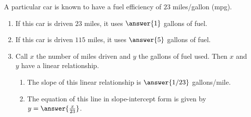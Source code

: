 \documentclass{ximera}
\author{Bobby Ramsey}
\begin{document}
\begin{exercise}
A particular car is known to have a fuel efficiency of $23$ miles/gallon (mpg).


\begin{enumerate}
	\item If this car is driven $23$ miles, it uses $\answer{1}$ gallons of fuel.

	\item If this car is driven $115$ miles, it uses $\answer{5}$ gallons of fuel.

	\item Call $x$ the number of miles driven and $y$ the gallons of fuel used. Then $x$ and $y$ have a linear relationship.
	
		\begin{enumerate}

			\item The slope of this linear relationship is $\answer{1/23}$ gallons/mile.

			\item The equation of this line in slope-intercept form is given by $y = \answer{\frac{x}{23}}$.

		\end{enumerate}
\end{enumerate}


\end{exercise}
\end{document}
